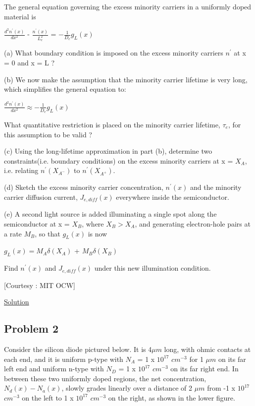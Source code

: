 \documentclass[12 pt]{article}
\begin{document}
The general equation governing the excess minority carriers in a uniformly doped material is 
\begin{center}
    $ \frac{d^{2}n^{'}(x)}{dx^{2}}$ - $\frac{n^{'}(x)}{L_{e}^{2}} $ = $-\frac{1}{D_{e}}g_{L}(x)$
\end{center}

(a) What boundary condition is imposed on the excess minority carriers $n^{'}$ at x = 0 and x = L ? \par

(b) We now make the assumption that the minority carrier lifetime is very long, which simplifies the general equation to:
\begin{center}
    $ \frac{d^{2}n^{'}(x)}{dx^{2}} \approx -\frac{1}{D_{e}}g_{L}(x)$
\end{center}
What quantitative restriction is placed on the minority carrier lifetime, $\tau_{e}$, for this assumption to be valid ? \par

(c) Using the long-lifetime approximation in part (b), determine two constraints(i.e. boundary conditions) on the excess minority carriers at x = $X_{A}$, i.e. relating $n^{'}(X_{A^{-}})$ to $n^{'}(X_{A^{+}})$. \par

(d) Sketch the excess minority carrier concentration, $n^{'}(x)$ and the minority carrier diffusion current, $J_{e,diff}(x)$ everywhere inside the semiconductor. \par

(e) A second light source is added illuminating a single spot along the semiconductor at x = $X_{B}$, where $X_{B} > X_{A}$, and generating electron-hole pairs at a rate $M_{B}$, so that $g_{L}(x)$ is now 
\begin{center}
    $ g_{L}(x) = M_{A}\delta (X_{A}) $ + $ M_{B}\delta (X_{B}) $
\end{center}
Find $n^{'}(x)$ and $J_{e,diff}(x)$ under this new illumination condition. \par

\hspace{12 cm}[Courtesy : MIT OCW]

\href{https://drive.google.com/file/d/1gS-qn-ki6J5MHo3JBRmUMPuXIGdvap_n/view?usp=sharing}{Solution}

\subsection{Problem 2}
Consider the silicon diode pictured below. It is 4$\mu m$ long, with ohmic contacts at each end, and it is uniform p-type with $N_{A}$ = 1 x $10^{17}$ $cm^{-3}$ for 1 $\mu m$ on its far left end and uniform n-type with $N_{D}$ = 1 x $10^{17}$ $cm^{-3}$ on its far right end. In between these two uniformly doped regions, the net concentration, $N_{d}(x)-N_{a}(x)$, slowly grades linearly over a distance of 2 $\mu m$ from -1 x $10^{17}$ $cm^{-3}$ on the left to 1 x $10^{17}$ $cm^{-3}$ on the right, as shown in the lower figure. 
\end{document}
